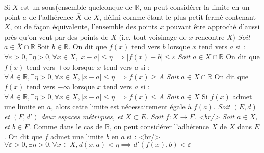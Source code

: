 \documentclass[11pt]{article}
\newcommand{\bb}[1]{\mathbb{#1}}
\newcommand{\ol}[1]{\overline{#1}}
\newcommand{\R}{\bb{R}}
\newcommand{\gt}{>}
\newcommand{\lt}{<}
\begin{document}
 \subtitle{Limites - incomplet}

\textit{  }
Si $X$ est un sous(ensemble quelconque de $\R$, on peut considérer la limite en un point $a$ de l'adhérence $\ol{X}$ de $X$, défini comme étant le plus petit fermé contenant $X$, ou de façon équivalente, l'ensemble des points $x$ pouvant être approché d'aussi près qu'on veut par des points de $X$ (i.e. tout voisinage de $x$ rencontre $X$)
\textit{ Soit $a \in \ol{X} \cap \R$ }
Soit $b \in \R$. On dit que $f(x)$ tend vers $b$ lorsque $x$ tend vers $a$ si :    $\forall \varepsilon \gt 0, \exists \eta \gt 0, \forall x \in X, |x − a| \leqslant \eta \implies |f(x)−b| \leqslant \varepsilon$
\textit{ Soit $a \in \ol{X} \cap \R$ }
On dit que $f(x)$ tend vers $+\infty$ lorsque $x$ tend vers $a$ si :    $\forall A \in \R, \exists \eta \gt 0, \forall x \in X, |x - a| \leqslant \eta \implies f(x) \geqslant A$
\textit{ Soit $a \in \ol{X} \cap \R$ }
On dit que $f(x)$ tend vers $-\infty$ lorsque $x$ tend vers $a$ si :    $\forall A \in \R, \exists \eta \gt 0, \forall x \in X, |x - a| \leqslant \eta \implies f(x) \leqslant A$
\textit{ Soit $a \in X$ }
Si $f(x)$ admet une limite en $a$, alors cette limite est nécessairement égale à $f(a)$.
\textit{ Soit $(E, d)$ et $(F, d')$ deux espaces métriques, et $X \subset E$. Soit $f : X \longrightarrow F$. <br/> Soit $a \in \ol{X}$, et $b \in F$. }
Comme dans le cas de $\R$, on peut considérer l'adhérence $\ol{X}$ de $X$ dans $E$. On dit que $f$ admet une limite $b$ en $a$ si : <br/>$\forall \varepsilon \gt 0, \exists \eta \gt 0, \forall x \in X, d(x, a) \lt \eta \implies d'(f(x), b) \lt \varepsilon$
\end{document}
